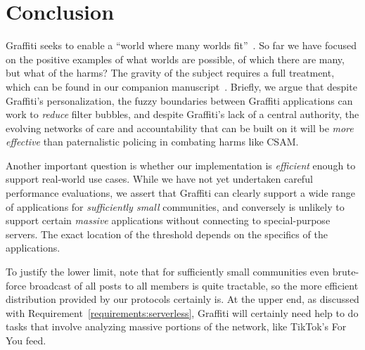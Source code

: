 \section{Conclusion}

Graffiti seeks to enable a ``world where many worlds fit''~\cite{escobarpluriverse}.
So far we have focused on the positive examples of what
worlds are possible, of which there are many,
but what of the harms?
The gravity of the subject requires a full treatment,
which can be found in our companion manuscript~\cite{companion}.
Briefly, we argue that despite Graffiti's personalization, the fuzzy boundaries between Graffiti applications can work to \emph{reduce} filter bubbles, and despite Graffiti's lack of a central authority, the evolving networks of care and accountability that can be built on it will be \emph{more effective} than paternalistic policing in combating harms like CSAM.


Another important question is whether our implementation is \emph{efficient} enough to support real-world use cases.  While we have not yet undertaken careful performance evaluations, we assert that Graffiti can clearly support a wide range of applications for \emph{sufficiently small} communities, and conversely is unlikely to support certain \emph{massive} applications without connecting to special-purpose servers.  The exact location of the threshold depends on the specifics of the applications.

To justify the lower limit, note that for sufficiently small communities even brute-force broadcast of all posts to all members is quite tractable, so the more efficient distribution provided by our protocols certainly is.   
At the upper end, as discussed with Requirement~\ref{requirements:serverless}, Graffiti will certainly need help to do tasks that involve analyzing massive
portions of the network, like TikTok's For You feed.


